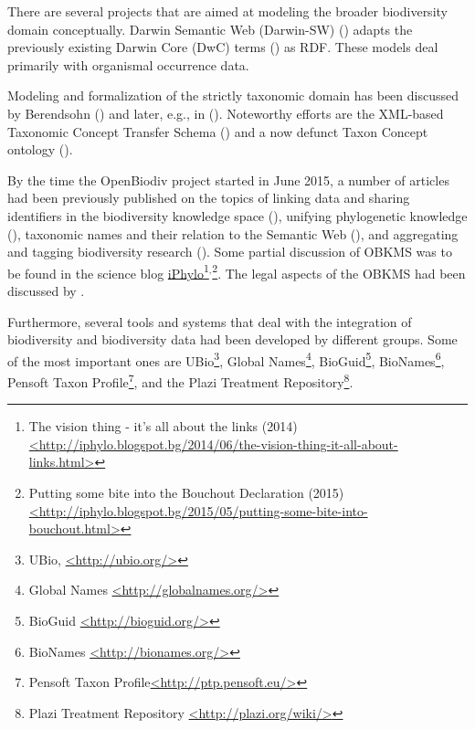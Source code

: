 There are several projects that are aimed at modeling the broader biodiversity domain conceptually. Darwin Semantic Web (Darwin-SW) (\cite{baskauf_darwin-sw:_2016}) adapts the previously existing Darwin Core (DwC) terms (\cite{wieczorek_darwin_2012}) as RDF. These models deal primarily with organismal occurrence data.

Modeling and formalization of the strictly taxonomic domain has been discussed by Berendsohn (\cite{berendsohn_concept_1995}) and later, e.g., in (\cite{franz_perspectives:_2009,sterner_taxonomy_2017}). Noteworthy efforts are the XML-based Taxonomic Concept Transfer Schema (\cite{taxonomic_names_and_concepts_interest_group_taxonomic_2006}) and a now defunct Taxon Concept ontology (\cite{devries_taxon_nodate}).

By the time the OpenBiodiv project started in June 2015, a number of articles had been previously published on the topics of linking data and sharing identifiers in the biodiversity knowledge space (\cite{page_biodiversity_2008}), unifying phylogenetic knowledge (\cite{parr_evolutionary_2012}), taxonomic names and their relation to the Semantic Web (\cite{page_taxonomic_2006,patterson_names_2010}), and aggregating and tagging biodiversity research (\cite{mindell_aggregating_2011}). Some partial discussion of OBKMS was to be found in the science blog \href{http://iphylo.blogspot.bg}{iPhylo}\footnote{The vision thing - it's all about the links (2014) \href{http://iphylo.blogspot.bg/2014/06/the-vision-thing-it-all-about-links.html}{<http://iphylo.blogspot.bg/2014/06/the-vision-thing-it-all-about-links.html>}}$^{,}$\footnote{Putting some bite into the Bouchout Declaration (2015) \href{http://iphylo.blogspot.bg/2015/05/putting-some-bite-into-bouchout.html}{<http://iphylo.blogspot.bg/2015/05/putting-some-bite-into-bouchout.html>}}. The legal aspects of the OBKMS had been discussed by \cite{egloff_open_2014}.

Furthermore, several tools and systems that deal with the integration of biodiversity and biodiversity data had been developed by different groups. Some of the most important ones are UBio\footnote{UBio, \href{http://ubio.org/}{<http://ubio.org/>}}, Global Names\footnote{Global Names \href{http://globalnames.org/}{<http://globalnames.org/>}}, BioGuid\footnote{BioGuid \href{http://bioguid.org/}{<http://bioguid.org/>}}, BioNames\footnote{BioNames \href{http://bionames.org/}{<http://bionames.org/>}}, Pensoft Taxon Profile\footnote{Pensoft Taxon Profile\href{http://ptp.pensoft.eu/}{<http://ptp.pensoft.eu/>}}, and the Plazi Treatment Repository\footnote{Plazi Treatment Repository \href{http://plazi.org/wiki/}{<http://plazi.org/wiki/>}}.

